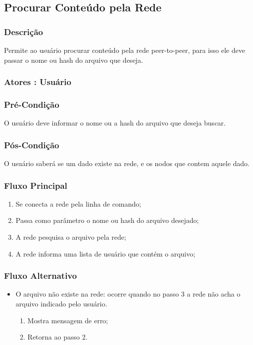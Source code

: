 \subsection{Procurar Conteúdo pela Rede}
\subsubsection{Descrição}
Permite ao usuário procurar conteúdo pela rede peer-to-peer, para isso ele deve passar o nome ou hash do arquivo que deseja.
\subsubsection{Atores : Usuário}
\subsubsection{Pré-Condição}
O usuário deve informar o nome ou a hash do arquivo que deseja buscar.
\subsubsection{Pós-Condição}
O usuário saberá se um dado existe na rede, e os nodos que contem aquele dado.
\subsubsection{Fluxo Principal}
\begin{enumerate}
    \item Se conecta a rede pela linha de comando;
    \item Passa como parâmetro o nome ou hash do arquivo desejado;
    \item A rede pesquisa o arquivo pela rede;
    \item A rede informa uma lista de usuário que contém o arquivo;
\end{enumerate}
\subsubsection{Fluxo Alternativo}
\begin{itemize}
    \item O arquivo não existe na rede: ocorre quando no passo 3 a rede não acha o arquivo indicado pelo usuário.
    \begin{enumerate}
        \item Mostra mensagem de erro;
        \item Retorna ao passo 2.
    \end{enumerate}
\end{itemize}


